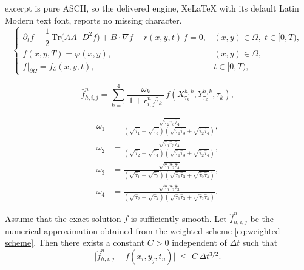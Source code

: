 \documentclass[10pt,a4paper]{amsart}
\begin{document}
excerpt is pure ASCII, so the delivered engine, XeLaTeX with its default Latin Modern text font, reports no missing character.
	\begin{equation}\label{eq:PDE-backward}
		\begin{cases}
			\partial_t f + \dfrac{1}{2}\,\mathrm{Tr}\big( A A^\top D^2 f \big) + B\cdot\nabla f - r(x,y,t)\,f = 0,
			& (x,y)\in\Omega,\; t\in[0,T),\\[2pt]
			f(x,y,T) = \varphi(x,y), & (x,y)\in\Omega,\\[1pt]
			f\big|_{\partial\Omega} = f_{\partial}(x,y,t), & t\in[0,T),
		\end{cases}
	\end{equation}

	\begin{equation}\label{eq:weighted-scheme}
		\hat f_{h,i,j}^n
		= \sum_{k=1}^4 \frac{\omega_k}{\,1+r_{i,j}^n\hat\tau_k\,}\,
		f(X_{\tau_k}^{h,k}, Y_{\tau_k}^{h,k}, \tau_k),
	\end{equation}

	\begin{equation}\label{eq:omega}
		\begin{aligned}
			\omega_1 &= \frac{\sqrt{\hat\tau_2 \hat\tau_3 \hat\tau_4}}
			{(\sqrt{\hat\tau_1}+\sqrt{\hat\tau_3})(\sqrt{\hat\tau_1 \hat\tau_3}+\sqrt{\hat\tau_2 \hat\tau_4})},\\
			\omega_2 &= \frac{\sqrt{\hat\tau_1 \hat\tau_3 \hat\tau_4}}
			{(\sqrt{\hat\tau_2}+\sqrt{\hat\tau_4})(\sqrt{\hat\tau_1 \hat\tau_3}+\sqrt{\hat\tau_2 \hat\tau_4})},\\
			\omega_3 &= \frac{\sqrt{\hat\tau_1 \hat\tau_2 \hat\tau_4}}
			{(\sqrt{\hat\tau_1}+\sqrt{\hat\tau_3})(\sqrt{\hat\tau_1 \hat\tau_3}+\sqrt{\hat\tau_2 \hat\tau_4})},\\
			\omega_4 &= \frac{\sqrt{\hat\tau_1 \hat\tau_2 \hat\tau_3}}
			{(\sqrt{\hat\tau_2}+\sqrt{\hat\tau_4})(\sqrt{\hat\tau_1 \hat\tau_3}+\sqrt{\hat\tau_2 \hat\tau_4})}.
		\end{aligned}
	\end{equation}

	\begin{lemma}\label{a}
		Assume that the exact solution $f$ is sufficiently smooth. Let $\hat f_{h,i,j}^n$ be the numerical approximation obtained from the weighted scheme \eqref{eq:weighted-scheme}. Then there exists a constant $C>0$ independent of $\Delta t$ such that
		\[
		\bigl|\hat f_{h,i,j}^n - f(x_i, y_j, t_n)\bigr| \;\le\; C\,\Delta t^{3/2}.
		\]
	\end{lemma}
\end{document}
